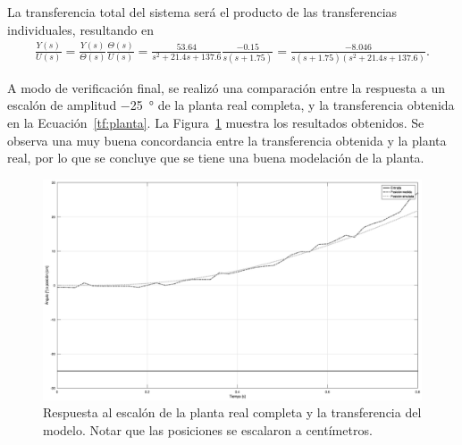 La transferencia total del sistema será el producto de las transferencias individuales, resultando en
\begin{align}
    \label{tf:planta}
    \frac{Y(s)}{U(s)} = \frac{Y(s)}{\Theta(s)} \frac{\Theta(s)}{U(s)}
        = \frac{53.64}{s^2 + 21.4 s + 137.6} \frac{-0.15}{s(s+1.75)}
        = \frac{-8.046}{s (s+1.75) (s^2 + 21.4 s + 137.6)}.
\end{align}

A modo de verificación final, se realizó una comparación entre la respuesta a un escalón de amplitud \qty{-25}{\degree} de la planta real completa, y la transferencia obtenida en la Ecuación~\eqref{tf:planta}. La Figura~\ref{fig:step-planta} muestra los resultados obtenidos. Se observa una muy buena concordancia entre la transferencia obtenida y la planta real, por lo que se concluye que se tiene una buena modelación de la planta.

\begin{figure}[!htbp]
    \centering
    \includegraphics[width=\linewidth]{img/step-planta.eps}
    \caption{Respuesta al escalón de la planta real completa y la transferencia del modelo. Notar que las posiciones se escalaron a centímetros.}
    \label{fig:step-planta}
\end{figure}

